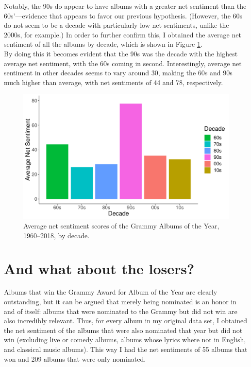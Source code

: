 \documentclass{article}
\begin{document}
\vskip 0.5cm

\FloatBarrier



Notably, the 90s do appear to have albums with a greater net sentiment than the 60s'---evidence that appears to favor our previous hypothesis. (However, the 60s do not seem to be a decade with particularly low net sentiments, unlike the 2000s, for example.) In order to further confirm this, I obtained the average net sentiment of all the albums by decade, which is shown in Figure \ref{fig:decade_sentiment}. \\


By doing this it becomes evident that the 90s was the decade with the highest average net sentiment, with the 60s coming in second. Interestingly, average net sentiment in other decades seems to vary around 30, making the 60s and 90s much higher than average, with net sentiments of 44 and 78, respectively.


\begin{figure}[h]
    \centering
    \includegraphics[scale=0.5]{Plots/graph_decade_mean_sentiment.pdf}
    \caption{Average net sentiment scores of the Grammy Albums of the Year, 1960--2018, by decade.}
    \label{fig:decade_sentiment}
\end{figure}


\FloatBarrier




\section*{And what about the losers?}


Albums that win the Grammy Award for Album of the Year are clearly outstanding, but it can be argued that merely being nominated is an honor in and of itself: albums that were nominated to the Grammy but did not win are also incredibly relevant. Thus, for every album in my original data set, I obtained the net sentiment of the albums that were also nominated that year but did not win (excluding live or comedy albums, albums whose lyrics where not in English, and classical music albums). This way I had the net sentiments of 55 albums that won and 209 albums that were only nominated. \\
\end{document}
